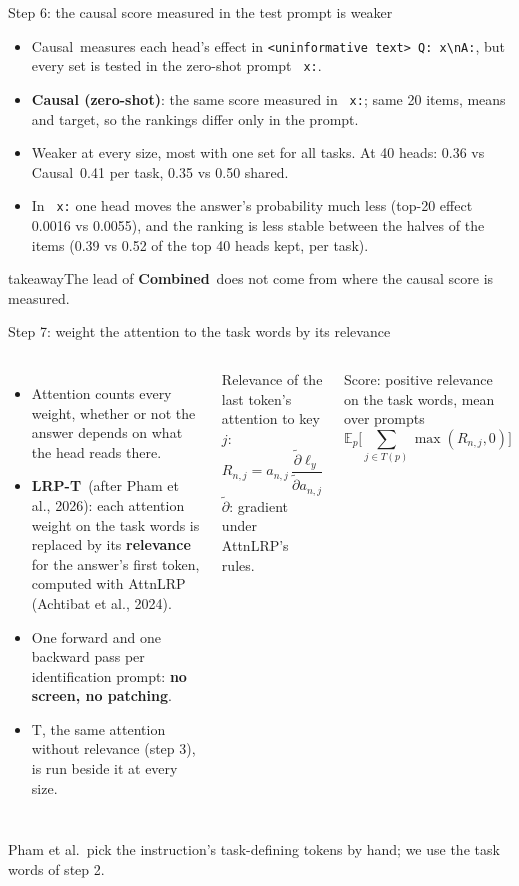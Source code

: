 \documentclass[aspectratio=169,11pt,xcolor=table]{beamer}
\newcommand{\takeaway}[1]{\vfill
  \begin{beamercolorbox}[wd=\textwidth,sep=6pt]{takeaway}#1\end{beamercolorbox}}
\newcommand{\gnote}[1]{{\footnotesize\color{gray}#1}}
\newcommand{\spaced}{\setlength{\itemsep}{0.55em}}
\newcommand{\Sel}{\textcolor{cSel}{\textbf{Combined}}}
\newcommand{\Causal}{\textcolor{cCaus}{Causal}}
\newcommand{\LRPT}{\textcolor{cLRP}{\textbf{LRP-T}}}
\newcommand{\nl}{\textbackslash n}
\begin{document}
\begin{frame}{Step 6: the causal score measured in the test prompt is weaker}
\begin{itemize}\spaced
\item \Causal\ measures each head's effect in \texttt{<uninformative text> Q: x\nl A:},
      but every set is tested in the zero-shot prompt \texttt{\ x:}.
\item \textbf{Causal (zero-shot)}: the same score measured in \texttt{\ x:};
      same 20 items, means and target, so the rankings differ only in the prompt.
\item Weaker at every size, most with one set for all tasks.
      At 40 heads: 0.36 vs \Causal\ 0.41 per task, 0.35 vs 0.50 shared.
\item In \texttt{\ x:} one head moves the answer's probability much less
      (top-20 effect 0.0016 vs 0.0055), and the ranking is less stable between the halves of the items
      (0.39 vs 0.52 of the top 40 heads kept, per task).
\end{itemize}
\takeaway{The lead of \Sel\ does not come from where the causal score is measured.}
\end{frame}

\begin{frame}{Step 7: weight the attention to the task words by its relevance}
\begin{columns}[T]
\small
\begin{itemize}\spaced
\item Attention counts every weight, whether or not the answer depends on what the head reads there.
\item \LRPT\ (after Pham et al., 2026): each attention weight on the task words is replaced by its
      \textbf{relevance} for the answer's first token, computed with AttnLRP (Achtibat et al., 2024).
\item One forward and one backward pass per identification prompt: \textbf{no screen, no patching}.
\item T, the same attention without relevance (step 3), is run beside it at every size.
\end{itemize}
\small
Relevance of the last token's attention to key $j$:
\[R_{n,j} = a_{n,j}\,\frac{\tilde\partial \ell_y}{\tilde\partial a_{n,j}}\]
$\tilde\partial$: gradient under AttnLRP's rules.

\vspace{0.6em}
Score: positive relevance on the task words, mean over prompts
\[\mathbb{E}_p\Big[\textstyle\sum_{j\in T(p)} \max(R_{n,j},0)\Big]\]
\end{columns}
\vfill
\gnote{Pham et al.\ pick the instruction's task-defining tokens by hand; we use the task words of step 2.}
\end{frame}
\end{document}
